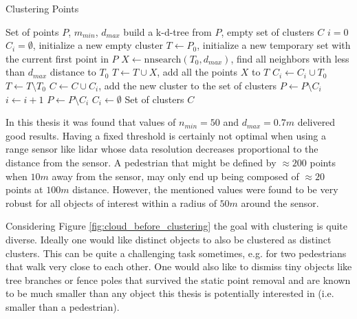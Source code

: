 \begin{algorithm}[H]
\caption{Clustering Points}\label{cluster_point}
\begin{algorithmic}
\Input Set of points $P$, $m_{min}$, $d_{max}$
\Init build a k-d-tree from $P$, empty set of clusters $C$
\State $i = 0$
\State $C_i = \emptyset$, initialize a new empty cluster
\State $T \leftarrow P_0$, initialize a new temporary set with the current first point in $P$ 
    \State $X \leftarrow \text{nnsearch}(T_0, d_{max})$, find all neighbors with less than $d_{max}$ distance to $T_0$
    \State $T \leftarrow T \cup X$, add all the points $X$ to $T$
    \State $C_i \leftarrow C_i \cup T_0$
    \State $T \leftarrow T\setminus T_0$
\EndWhile
{}
    \State $C \leftarrow C \cup C_i$, add the new cluster to the set of clusters
    \State $P \leftarrow P \setminus C_i$
    \State $i \leftarrow i+1$
\Else
    \State $P \leftarrow P \setminus C_i$
    \State $C_i \leftarrow \emptyset$
\EndIf
\EndWhile
\Output Set of clusters $C$
\end{algorithmic}
\end{algorithm}

In this thesis it was found that values of $n_{min} = 50$ and $d_{max} = 0.7m$ delivered good results. Having a fixed threshold is certainly not optimal when using a range sensor like lidar whose data resolution decreases proportional to the distance from the sensor. A pedestrian that might be defined by $\approx 200$ points when $10m$ away from the sensor, may only end up being composed of $\approx 20$ points at $100m$ distance. However, the mentioned values were found to be very robust for all objects of interest within a radius of $50m$ around the sensor.

Considering Figure \ref{fig:cloud_before_clustering} the goal with clustering is quite diverse. Ideally one would like distinct objects to also be clustered as distinct clusters. This can be quite a challenging task sometimes, e.g. for two pedestrians that walk very close to each other. One would also like to dismiss tiny objects like tree branches or fence poles that survived the static point removal and are known to be much smaller than any object this thesis is potentially interested in (i.e. smaller than a pedestrian). 


